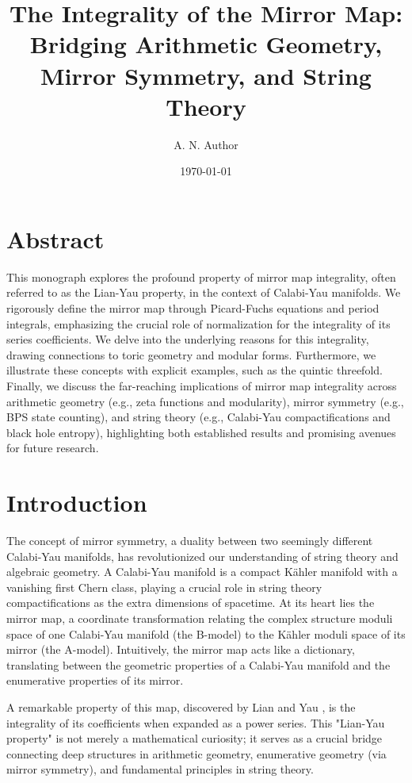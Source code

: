 \documentclass{book}
\theoremstyle{definition}
\newenvironment{abstract}{\chapter*{Abstract}}{}
\begin{document}
\title{The Integrality of the Mirror Map: Bridging Arithmetic Geometry, Mirror Symmetry, and String Theory}
\author{A. N. Author}
\date{\today}

\maketitle

\begin{abstract}
This monograph explores the profound property of mirror map integrality, often referred to as the Lian-Yau property, in the context of Calabi-Yau manifolds. We rigorously define the mirror map through Picard-Fuchs equations and period integrals, emphasizing the crucial role of normalization for the integrality of its series coefficients. We delve into the underlying reasons for this integrality, drawing connections to toric geometry and modular forms. Furthermore, we illustrate these concepts with explicit examples, such as the quintic threefold. Finally, we discuss the far-reaching implications of mirror map integrality across arithmetic geometry (e.g., zeta functions and modularity), mirror symmetry (e.g., BPS state counting), and string theory (e.g., Calabi-Yau compactifications and black hole entropy), highlighting both established results and promising avenues for future research.
\end{abstract}

\tableofcontents

\chapter{Introduction}
The concept of mirror symmetry, a duality between two seemingly different Calabi-Yau manifolds, has revolutionized our understanding of string theory and algebraic geometry. A Calabi-Yau manifold is a compact K\"ahler manifold with a vanishing first Chern class, playing a crucial role in string theory compactifications as the extra dimensions of spacetime. At its heart lies the mirror map, a coordinate transformation relating the complex structure moduli space of one Calabi-Yau manifold (the B-model) to the K\"ahler moduli space of its mirror (the A-model). Intuitively, the mirror map acts like a dictionary, translating between the geometric properties of a Calabi-Yau manifold and the enumerative properties of its mirror.

A remarkable property of this map, discovered by Lian and Yau \cite{LianYau1997}, is the integrality of its coefficients when expanded as a power series. This "Lian-Yau property" is not merely a mathematical curiosity; it serves as a crucial bridge connecting deep structures in arithmetic geometry, enumerative geometry (via mirror symmetry), and fundamental principles in string theory.
\end{document}
